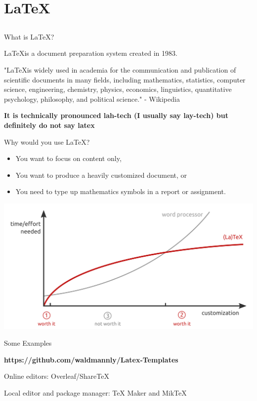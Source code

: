 \documentclass[xcolor=dvipsnames]{beamer}
\begin{document}
\section{LaTeX}
\subsection{}

\begin{frame}{What is LaTeX?}

\centering \LaTeX is a document preparation system created in 1983. 

\vfill
\small{"\LaTeX is widely used in academia for the communication and publication of scientific documents in many fields, including mathematics, statistics, computer science, engineering, chemistry, physics, economics, linguistics, quantitative psychology, philosophy, and political science." - Wikipedia}

\vfill 
\centering \textbf{It is technically pronounced lah-tech (I usually say lay-tech) but definitely do not say latex}

\end{frame}

\begin{frame}{Why would you use LaTeX?}
\begin{itemize}
\item You want to focus on content only,
\item You want to produce a heavily customized document, or 
\item You need to type up mathematics symbols in a report or assignment. 
\end{itemize}


\centering \includegraphics[width =.8\linewidth]{timeVeffort.png}

\end{frame} 

\begin{frame}{Some Examples} 

\centering \Large \textbf{\color{blue} https://github.com/waldmannly/Latex-Templates}

\vfill
\begin{center}
\centering Online editors: Overleaf/ShareTeX 

\vspace*{.5cm}
\small \centering Local editor and package manager: TeX Maker and MikTeX
\end{center}
\end{frame}
\end{document}

